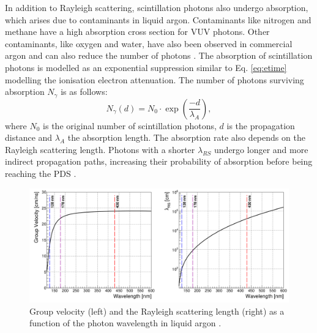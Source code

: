 In addition to Rayleigh scattering, scintillation photons also undergo absorption, which arises due to contaminants in liquid argon.
Contaminants like nitrogen \cite{photon_nitrogen} and methane \cite{photon_methane} have a high absorption cross section for VUV photons.
Other contaminants, like oxygen and water, have also been observed in commercial argon and can also reduce the number of photons \cite{photon_commercial}. 
The absorption of scintillation photons is modelled as an exponential suppression similar to Eq. \ref{eq:etime} modelling the ionisation electron attenuation.
The number of photons surviving absorption $N_\gamma$ is as follows:
\begin{equation}
	N_{\gamma} (d) = N_0 \cdot \exp\left(\frac{-d}{\lambda_{A}}\right),
\label{eq:absorption}
\end{equation}
where $N_0$ is the original number of scintillation photons, $d$ is the propagation distance and $\lambda_A$ the absorption length.
The absorption rate also depends on the Rayleigh scattering length. 
Photons with a shorter $\lambda_{RS}$ undergo longer and more indirect propagation paths, increasing their probability of absorption before being reaching the PDS \cite{PatrickPhD}.


\begin{figure}[b!] 
\centering    
\includegraphics[width=1.0\textwidth]{vuv_visible}
\caption[Group Velocity and Rayleigh Scattering Length of Photons in Liquid Argon]{
Group velocity (left) and the Rayleigh scattering length (right) as a function of the photon wavelength in liquid argon \cite{PatrickPhD}.
}
\label{fig:vuv_visible}
\end{figure}

